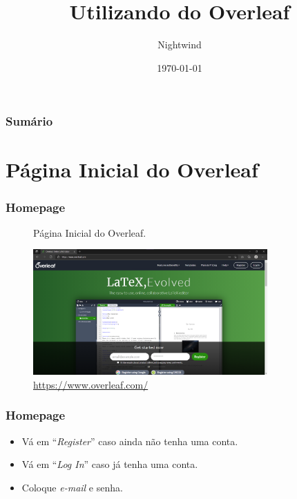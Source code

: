 \documentclass{beamer}
\title{Utilizando do Overleaf}
\author{Nightwind}
\institute[CTISM]{Colégio Técnico Industrial de Santa Maria}
\date{\today}
\begin{document}
    \frame{\titlepage}

    \begin{frame}
        \frametitle{Sumário}
        \tableofcontents
    \end{frame}

    \section[Página Inicial]{Página Inicial do Overleaf}
    \begin{frame}
        \frametitle{Homepage}
    \begin{figure}
        \centering
        \caption[HomePage]{Página Inicial do Overleaf.}
        \label{fig:homepageOverleaf}
        \includegraphics[width=0.8\textwidth]{../images/homepageOverleaf.png}
        \caption*{\footnotesize \url{https://www.overleaf.com/}}
    \end{figure}    
    \end{frame}

    \begin{frame}
        \frametitle{Homepage}
    \begin{itemize}
        \item Vá em ``\textit{Register}'' caso ainda não tenha uma conta.
        \item Vá em ``\textit{Log In}'' caso já tenha uma conta. 
        \item Coloque \textit{e-mail} e senha.
    \end{itemize}
    \end{frame}
        
\end{document}
